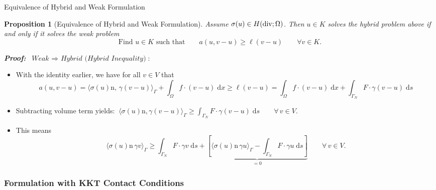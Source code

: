 \documentclass[10pt,aspectratio=169]{beamer}
\newtheorem{proposition}{Proposition}[section]
\def\d{{\mathrm{d}}}
\def\dx{{\d x}}
\def\ds{{\d s}}
\newcommand{\diver}{\operatornamewithlimits{div}}
\begin{document}
\begin{frame}{Equivalence of Hybrid and Weak Formulation}
	\begin{proposition}[Equivalence of Hybrid and Weak Formulation]
		Assume $\sigma(u)\in H(\diver;\Omega)$. Then $u\in K$ solves the hybrid problem above if and only if it solves the weak problem
		\begin{equation*}
			\text{Find }u\in K\text{ such that}\qquad a(u,v-u)\ge\ell(v-u)\qquad \forall v\in K.
		\end{equation*}
	\end{proposition}
	\textbf{\em Proof:} $\ \textit{Weak }\Rightarrow\textit{ Hybrid (Hybrid Inequality)}$:
	\begin{itemize}
		\item With the identity earlier, we have for all $v\in V$ that
		      \begin{equation*}
			      a(u,v-u) = \langle \sigma(u)\mathrm{n},\, \gamma(v-u)\rangle_\Gamma + \int_\Omega f\cdot(v-u)\;\dx \ge \ell(v-u)=\int_\Omega f\cdot(v-u)\;\dx +\int_{\Gamma_N}F\cdot\gamma(v-u)\;\ds
		      \end{equation*}
		\item Subtracting volume term yields: $\ \displaystyle  \langle \sigma(u)\mathrm n,\gamma(v-u)\rangle_\Gamma \ge\int_{\Gamma_N}F\cdot\gamma(v-u)\;\ds\qquad \forall\,v\in V$.
		\item This means
		      \begin{equation*}
			      \langle\sigma(u)\mathrm{n}\,\gamma v\rangle_\Gamma\ge \int_{\Gamma_N}F\cdot \gamma v\;\ds + \underbrace{\left[\langle\sigma(u)\mathrm{n}\,\gamma u\rangle_\Gamma-\int_{\Gamma_N}F\cdot\gamma u\;\ds\right]}_{ = 0}\qquad \forall\,v\in V.
		      \end{equation*}
	\end{itemize}
\end{frame}

\subsubsection{Formulation with KKT Contact Conditions}
\end{document}

